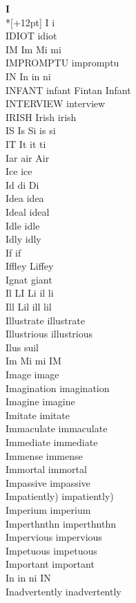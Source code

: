 \vspace{14pt}
\noindent\textbf{\Large I}\\*[+12pt]
I i\\
IDIOT idiot\\
IM Im Mi mi\\
IMPROMPTU impromptu\\
IN In in ni\\
INFANT infant Fintan Infant\\
INTERVIEW interview\\
IRISH Irish irish\\
IS Is Si is si\\
IT It it ti\\
Iar air Air\\
Ice ice\\
Id di Di\\
Idea idea\\
Ideal ideal\\
Idle idle\\
Idly idly\\
If if\\
Iffley Liffey\\
Ignat giant\\
Il LI Li il li\\
Ill Lil ill lil\\
Illustrate illustrate\\
Illustrious illustrious\\
Ilus suil\\
Im Mi mi IM\\
Image image\\
Imagination imagination\\
Imagine imagine\\
Imitate imitate\\
Immaculate immaculate\\
Immediate immediate\\
Immense immense\\
Immortal immortal\\
Impassive impassive\\
Impatiently) impatiently)\\
Imperium imperium\\
Imperthnthn imperthnthn\\
Impervious impervious\\
Impetuous impetuous\\
Important important\\
In in ni IN\\
Inadvertently inadvertently\\
